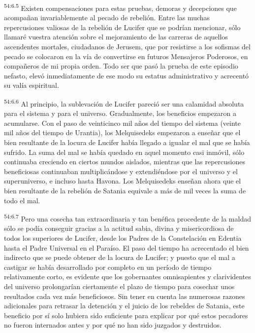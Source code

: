 \par
\textsuperscript{54:6.5} Existen compensaciones para estas pruebas, demoras y decepciones que acompañan invariablemente al pecado de rebelión. Entre las muchas repercusiones valiosas de la rebelión de Lucifer que se podrían mencionar, sólo llamaré vuestra atención sobre el mejoramiento de las carreras de aquellos ascendentes mortales, ciudadanos de Jerusem, que por resistirse a los sofismas del pecado se colocaron en la vía de convertirse en futuros Mensajeros Poderosos, en compañeros de mi propia orden. Todo ser que pasó la prueba de este episodio nefasto, elevó inmediatamente de ese modo su estatus administrativo y acrecentó su valía espiritual.

\par
\textsuperscript{54:6.6} Al principio, la sublevación de Lucifer pareció ser una calamidad absoluta para el sistema y para el universo. Gradualmente, los beneficios empezaron a acumularse. Con el paso de veinticinco mil años del tiempo del sistema (veinte mil años del tiempo de Urantia), los Melquisedeks empezaron a enseñar que el bien resultante de la locura de Lucifer había llegado a igualar el mal que se había sufrido. La suma del mal se había quedado en aquel momento casi inmóvil, sólo continuaba creciendo en ciertos mundos aislados, mientras que las repercusiones beneficiosas continuaban multiplicándose y extendiéndose por el universo y el superuniverso, e incluso hasta Havona. Los Melquisedeks enseñan ahora que el bien resultante de la rebelión de Satania equivale a más de mil veces la suma de todo el mal.

\par
\textsuperscript{54:6.7} Pero una cosecha tan extraordinaria y tan benéfica procedente de la maldad sólo se podía conseguir gracias a la actitud sabia, divina y misericordiosa de todos los superiores de Lucifer, desde los Padres de la Constelación en Edentia hasta el Padre Universal en el Paraíso. El paso del tiempo ha acrecentado el bien indirecto que se puede obtener de la locura de Lucifer; y puesto que el mal a castigar se había desarrollado por completo en un período de tiempo relativamente corto, es evidente que los gobernantes omnisapientes y clarividentes del universo prolongarían ciertamente el plazo de tiempo para cosechar unos resultados cada vez más beneficiosos. Sin tener en cuenta las numerosas razones adicionales para retrasar la detención y el juicio de los rebeldes de Satania, este beneficio por sí solo hubiera sido suficiente para explicar por qué estos pecadores no fueron internados antes y por qué no han sido juzgados y destruidos.

